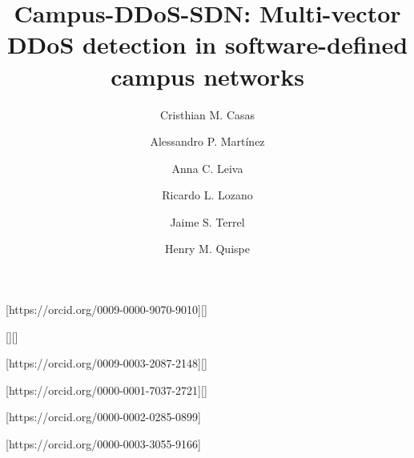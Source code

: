 \documentclass[ASNA,twocolumn]{USG}
\begin{document}
\title{Campus-DDoS-SDN: Multi-vector DDoS detection in software-defined campus networks}
\author[1]{Cristhian M. Casas}[https://orcid.org/0009-0000-9070-9010][]
\author[2]{Alessandro P. Martínez}[][]
\author[3]{Anna C. Leiva}[https://orcid.org/0009-0003-2087-2148][]
\author[4]{Ricardo L. Lozano}[https://orcid.org/0000-0001-7037-2721][]
\author[5]{Jaime S. Terrel}[https://orcid.org/0000-0002-0285-0899]
\author[6]{Henry M. Quispe}[https://orcid.org/0000-0003-3055-9166]


















\end{document}
